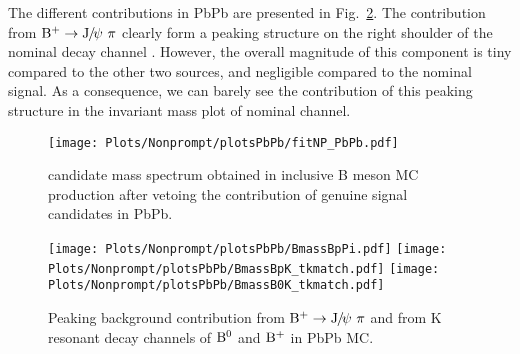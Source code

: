 The different contributions in PbPb are presented in Fig.~\ref{fig:Bplus_peaking_PbPb}.
The contribution from $\mathrm{B}^{+}\rightarrow\mathrm{J}\hspace{-.08em}/\hspace{-.14em}\psi~\pi$ clearly form a peaking structure on the right shoulder of the nominal decay channel \Bplusdecay. However, the overall magnitude of this component is tiny compared to the other two sources, and negligible compared to the nominal signal. As a consequence, we can barely see the contribution of this peaking structure in the invariant mass plot of \Bplus nominal channel.

\begin{figure}[h]
\begin{center}
\texttt{[image: Plots/Nonprompt/plotsPbPb/fitNP\_PbPb.pdf]}
\caption{\Bplus candidate mass spectrum obtained in inclusive B meson MC production after vetoing the contribution of genuine \Bplus signal candidates in PbPb.}
\label{fig:npBplus}
\end{center}
\end{figure}

\begin{figure}[h]
\begin{center}
\texttt{[image: Plots/Nonprompt/plotsPbPb/BmassBpPi.pdf]}
\texttt{[image: Plots/Nonprompt/plotsPbPb/BmassBpK\_tkmatch.pdf]}
\texttt{[image: Plots/Nonprompt/plotsPbPb/BmassB0K\_tkmatch.pdf]}
\caption{Peaking background contribution from $\mathrm{B}^{+}\rightarrow\mathrm{J}\hspace{-.08em}/\hspace{-.14em}\psi~\pi$ and from K resonant decay channels of $\mathrm{B}^{0}$ and $\mathrm{B}^{+}$ in PbPb MC.}
\label{fig:Bplus_peaking_PbPb}
\end{center}
\end{figure}

\clearpage
